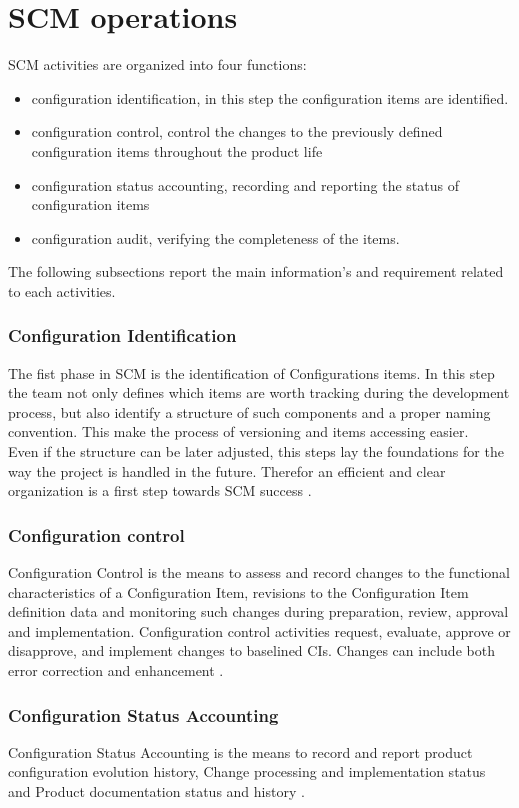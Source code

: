 \documentclass[../main.tex]{subfiles}
\begin{document}
\section{SCM operations}
SCM activities are organized into four functions:
\begin{itemize}
    \item configuration identification, in this step the configuration items are identified.
    \item configuration control, control the changes to the previously defined configuration items throughout the product life
    \item configuration status accounting, recording and reporting the status of configuration items
    \item configuration audit, verifying the completeness of the items. 
\end{itemize}
The following subsections report the main information's and requirement related to each activities.
\subsubsection{Configuration Identification}
The fist phase in SCM is the identification of Configurations items. In this step the team not only defines which items are worth tracking during the development process, but also identify a structure of such components and a proper naming convention. This make the process of versioning and items accessing easier.\\
Even if the structure can be later adjusted, this steps lay the foundations for the way the project is handled in the future. Therefor an efficient and clear organization is a first step towards SCM success \cite{ieestandard}.
\subsubsection{Configuration control}
Configuration Control is the means to assess and record changes to the functional characteristics of a Configuration Item, revisions to the  Configuration Item definition data and monitoring such changes during preparation, review, approval and implementation. Configuration control activities request, evaluate, approve or disapprove, and implement changes to baselined CIs. Changes can include both error correction and enhancement \cite{ieestandard}.
\subsubsection{Configuration Status Accounting}
Configuration Status Accounting is the means to record and report product configuration evolution history, Change processing and implementation status and Product documentation status and history \cite{ieestandard}.
\end{document}

